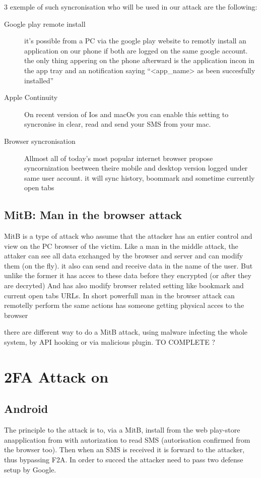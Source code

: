 \documentclass[11pt, a4paper,twocolumn]{article}
\begin{document}
3 exemple of such syncronisation who will be used in our attack are the 
following:
\begin{description}%
  \item[Google play remote install] it's possible from a PC via the google play 
  website to remotly install an application on our phone if both are logged on 
  the same google account. the only thing appering on the phone afterward is the 
  application incon in the app tray and an notification saying ``<app\_name> as been succesfully installed'' 
  
  \item[Apple Continuity] On recent version of Ios and macOs you can enable this 
  setting to syncronise in clear, read and send your SMS from your mac.
  
  \item[Browser syncronisation] Allmost all of today's most popular internet browser 
  propose syncornization beetween theire mobile and desktop version logged under same user account.
  it will sync history, boommark and sometime currently open tabs 
\end{description}
\subsection{MitB: Man in the browser attack}
MitB is a type of attack who assume that the attacker has an entier control and view on the PC browser of the victim. Like a man in the middle attack, the attaker can see all data 
exchanged by the browser and server and can modify them (on the fly). it also can send and receive data in the name of the user. But unlike the former it has acces to these data before they encrypted (or after they are decryted) And has also modify browser related setting like bookmark and current open tabs URLs. In short powerfull man in the browser attack can remotelly perform the same actions has someone getting physical acces to the browser

there are different way to do a MitB attack, using malware infecting the whole system, by API hooking or via malicious plugin. TO COMPLETE ?
\section{2FA Attack on }
\subsection{Android}
The principle to the attack is to, via a MitB, install from the web play-store anapplication from with autorization to read SMS (autorisation confirmed from the browser 
too). Then when an SMS is received it is forward to the attacker, thus bypassing 
F2A. In order to succed the attacker need to pass two defense setup by Google.
\end{document}
